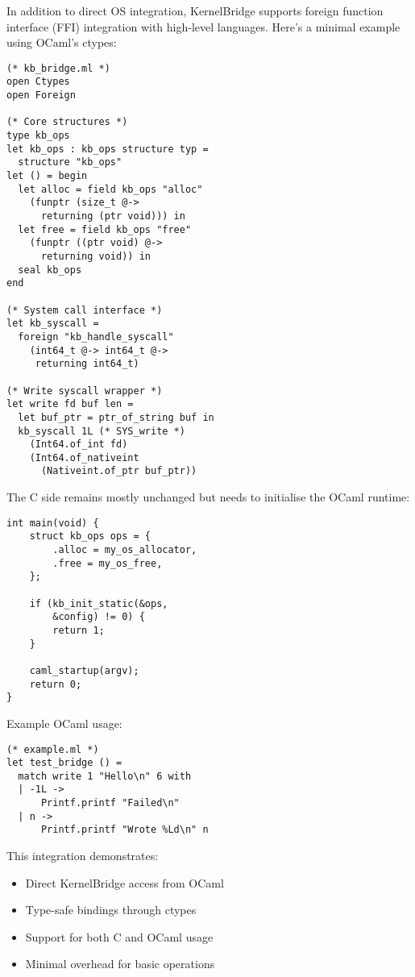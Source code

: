 \documentclass[conference]{IEEEtran}
\begin{document}
In addition to direct OS integration, KernelBridge
supports foreign function interface (FFI)
integration with high-level languages. Here's a
minimal example using OCaml's ctypes:

\begin{verbatim}
(* kb_bridge.ml *)
open Ctypes
open Foreign

(* Core structures *)
type kb_ops
let kb_ops : kb_ops structure typ = 
  structure "kb_ops"
let () = begin
  let alloc = field kb_ops "alloc" 
    (funptr (size_t @-> 
      returning (ptr void))) in
  let free = field kb_ops "free" 
    (funptr ((ptr void) @-> 
      returning void)) in
  seal kb_ops
end

(* System call interface *)
let kb_syscall = 
  foreign "kb_handle_syscall"
    (int64_t @-> int64_t @-> 
     returning int64_t)

(* Write syscall wrapper *)
let write fd buf len =
  let buf_ptr = ptr_of_string buf in
  kb_syscall 1L (* SYS_write *)
    (Int64.of_int fd)
    (Int64.of_nativeint 
      (Nativeint.of_ptr buf_ptr))
\end{verbatim}

The C side remains mostly unchanged but needs
to initialise the OCaml runtime:

\begin{verbatim}
int main(void) {
    struct kb_ops ops = {
        .alloc = my_os_allocator,
        .free = my_os_free,
    };
    
    if (kb_init_static(&ops, 
        &config) != 0) {
        return 1;
    }
    
    caml_startup(argv);
    return 0;
}
\end{verbatim}

Example OCaml usage:

\begin{verbatim}
(* example.ml *)
let test_bridge () =
  match write 1 "Hello\n" 6 with
  | -1L -> 
      Printf.printf "Failed\n"
  | n -> 
      Printf.printf "Wrote %Ld\n" n
\end{verbatim}

This integration demonstrates:
\begin{itemize}
	\item Direct KernelBridge access from OCaml
	\item Type-safe bindings through ctypes
	\item Support for both C and OCaml usage
	\item Minimal overhead for basic operations
\end{itemize}
\end{document}
